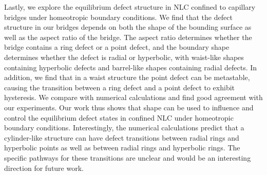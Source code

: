 Lastly, we explore the equilibrium defect structure in NLC confined to capillary bridges under homeotropic boundary conditions.
We find that the defect structure in our bridges depends on both the shape of the bounding surface as well as the aspect ratio of the bridge.
The aspect ratio determines whether the bridge contains a ring defect or a point defect, and the boundary shape determines whether the defect is radial or hyperbolic, with waist-like shapes containing hyperbolic defects and barrel-like shapes containing radial defects.
In addition, we find that in a waist structure the point defect can be metastable, causing the transition between a ring defect and a point defect to exhibit hysteresis.
We compare with numerical calculations and find good agreement with our experiments.
Our work thus shows that shape can be used to influence and control the equilibrium defect states in confined NLC under homeotropic boundary conditions.
Interestingly, the numerical calculations predict that a cylinder-like structure can have defect transitions between radial rings and hyperbolic points as well as between radial rings and hyperbolic rings.
The specific pathways for these transitions are unclear and would be an interesting direction for future work.
